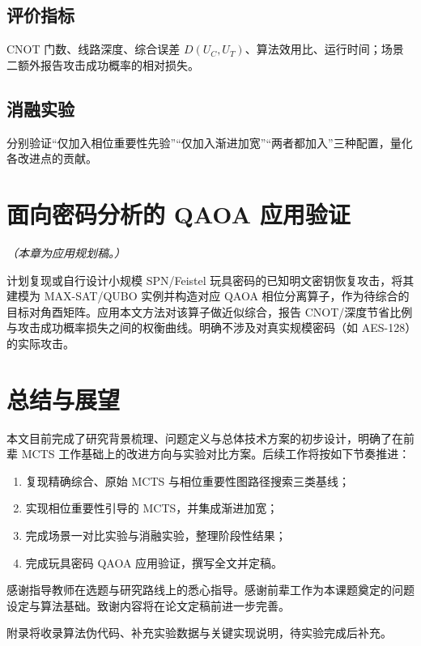 \documentclass{HDU-Bachelor-Thesis}
\begin{document}
\subsection{评价指标}

CNOT 门数、线路深度、综合误差 $D(U_C,U_T)$、算法效用比、运行时间；场景二额外报告攻击成功概率的相对损失。

\subsection{消融实验}

分别验证“仅加入相位重要性先验”“仅加入渐进加宽”“两者都加入”三种配置，量化各改进点的贡献。

\clearpage
\section{面向密码分析的 QAOA 应用验证}

\emph{（本章为应用规划稿。）}

计划复现或自行设计小规模 SPN/Feistel 玩具密码的已知明文密钥恢复攻击，将其建模为 MAX-SAT/QUBO 实例并构造对应 QAOA 相位分离算子，作为待综合的目标对角酉矩阵。应用本文方法对该算子做近似综合，报告 CNOT/深度节省比例与攻击成功概率损失之间的权衡曲线。明确不涉及对真实规模密码（如 AES-128）的实际攻击。

\clearpage
\section{总结与展望}

本文目前完成了研究背景梳理、问题定义与总体技术方案的初步设计，明确了在前辈 MCTS 工作基础上的改进方向与实验对比方案。后续工作将按如下节奏推进：

\begin{enumerate}
  \item 复现精确综合、原始 MCTS 与相位重要性图路径搜索三类基线；
  \item 实现相位重要性引导的 MCTS，并集成渐进加宽；
  \item 完成场景一对比实验与消融实验，整理阶段性结果；
  \item 完成玩具密码 QAOA 应用验证，撰写全文并定稿。
\end{enumerate}

\clearpage
{}

感谢指导教师在选题与研究路线上的悉心指导。感谢前辈工作为本课题奠定的问题设定与算法基础。致谢内容将在论文定稿前进一步完善。

\clearpage
{}
\printbibliography[heading=bibintoc]

\clearpage
{}

附录将收录算法伪代码、补充实验数据与关键实现说明，待实验完成后补充。
\end{document}
